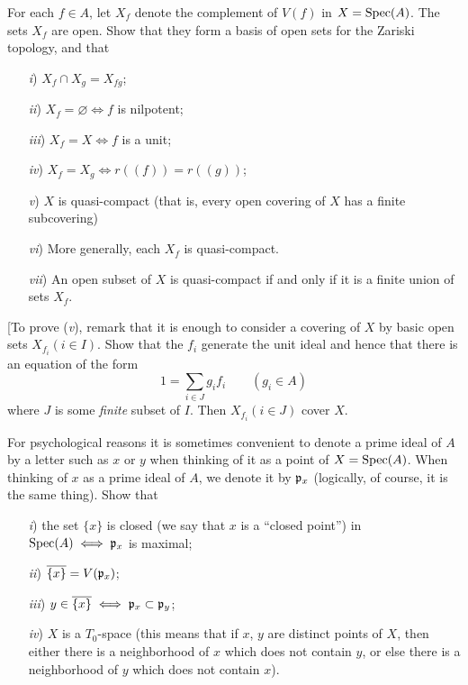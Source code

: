 \documentclass[10pt]{amsart}
\begin{document}
\begin{exercise}
    For each $f\in A$, let $X_f$ denote the complement of $V(f)$ in $X = \operatorname{Spec}(A)$. The sets $X_f$ are open. Show that they form a 
    basis of open sets for the Zariski topology, and that
    \begin{itemize}
        \item[\emph{i})] $X_f \cap X_g = X_{fg}$;
        \item[\emph{ii})] $X_f = \varnothing \iff f$ is nilpotent;
        \item[\emph{iii})] $X_f = X \iff f$ is a unit;
        \item[\emph{iv})] $X_f = X_g \iff r((f)) = r((g))$;
        \item[\emph{v})] $X$ is quasi-compact (that is, every open covering of $X$ has a finite subcovering)
        \item[\emph{vi})] More generally, each $X_f$ is quasi-compact.
        \item[\emph{vii})] An open subset of $X$ is quasi-compact if and only if it is a finite union of
        sets $X_f$.
    \end{itemize}
    [To prove (\emph{v}), remark that it is enough to consider a covering of $X$ by basic open sets $X_{f_i} (i \in I)$. 
    Show that the $f_i$ generate the unit ideal and hence that there is an equation of the form
    \[
        1 = \sum_{i \in J}g_if_i \qquad (g_i \in A)   
    \]
    where $J$ is some \emph{finite} subset of $I$. Then $X_{f_i} (i \in J)$ cover $X$. 
\end{exercise}

\begin{exercise}
    For psychological reasons it is sometimes convenient to denote a prime ideal 
    of $A$ by a letter such as $x$ or $y$ when thinking of it as a point of $X= \operatorname{Spec}(A)$. 
    When thinking of $x$ as a prime ideal of $A$, we denote it by $\mathfrak{p}_x$ (logically, of course, 
    it is the same thing). Show that
    \begin{itemize}
        \item[\emph{i})] the set $\{x\}$ is closed (we say that $x$ is a ``closed point'') in 
        $\operatorname{Spec}(A) \iff \mathfrak{p}_x$ is maximal; 
        \item[\emph{ii})] $\overline{\{x\}} = V(\mathfrak{p}_x)$;
        \item[\emph{iii})] $y \in \overline{\{x\}} \iff \mathfrak{p}_x \subset \mathfrak{p}_y$;
        \item[\emph{iv})] $X$ is a $T_0$-space (this means that if $x$, $y$ are distinct points of $X$, then either
        there is a neighborhood of $x$ which does not contain $y$, or else there is a neighborhood of $y$ which does not contain $x$).
    \end{itemize}
\end{exercise}
\end{document}
